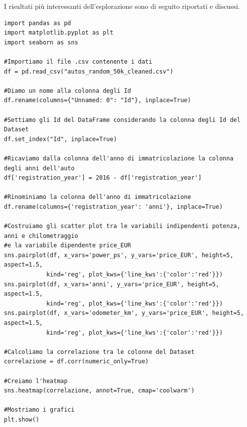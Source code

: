 I risultati più interessanti dell'esplorazione sono di seguito riportati e discussi.

\begin{lstlisting}
import pandas as pd
import matplotlib.pyplot as plt
import seaborn as sns

#Importiamo il file .csv contenente i dati
df = pd.read_csv("autos_random_50k_cleaned.csv")

#Diamo un nome alla colonna degli Id
df.rename(columns={"Unnamed: 0": "Id"}, inplace=True)

#Settiamo gli Id del DataFrame considerando la colonna degli Id del Dataset
df.set_index("Id", inplace=True)

#Ricaviamo dalla colonna dell'anno di immatricolazione la colonna degli anni dell'auto
df['registration_year'] = 2016 - df['registration_year']

#Rinominiamo la colonna dell'anno di immatricolazione
df.rename(columns={'registration_year': 'anni'}, inplace=True)

#Costruiamo gli scatter plot tra le variabili indipendenti potenza, anni e chilometraggio
#e la variabile dipendente price_EUR
sns.pairplot(df, x_vars='power_ps', y_vars='price_EUR', height=5, aspect=1.5, 
            kind='reg', plot_kws={'line_kws':{'color':'red'}})
sns.pairplot(df, x_vars='anni', y_vars='price_EUR', height=5, aspect=1.5, 
            kind='reg', plot_kws={'line_kws':{'color':'red'}})
sns.pairplot(df, x_vars='odometer_km', y_vars='price_EUR', height=5, aspect=1.5, 
            kind='reg', plot_kws={'line_kws':{'color':'red'}})

#Calcoliamo la correlazione tra le colonne del Dataset
correlazione = df.corr(numeric_only=True)

#Creiamo l'heatmap
sns.heatmap(correlazione, annot=True, cmap='coolwarm')

#Mostriamo i grafici
plt.show()
\end{lstlisting}

